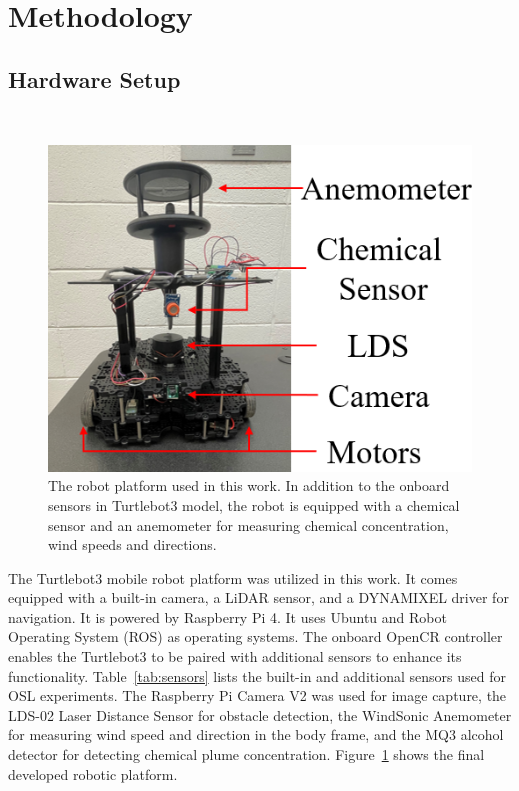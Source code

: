 \section{Methodology}
\subsection{Hardware Setup}\label{Subec:OSLHardware}

\begin{figure}[h] %

\ \\
\vspace*{-.18in}

\begin{center}
\includegraphics[width=0.6\columnwidth]{Main/Figure/olfaction_Turtlebot.png}\hspace*{0.04in}
\end{center}
\vspace{-.1in}

\caption
{The robot platform used in this work. In addition to the onboard sensors in Turtlebot3 model, the robot is equipped with a chemical sensor and an anemometer for measuring chemical concentration, wind speeds and directions.}
\label{fig:olfaction_robot}
\end{figure}

The Turtlebot3 mobile robot platform was utilized in this work. It comes equipped with a built-in camera, a LiDAR sensor, and a DYNAMIXEL driver for navigation. It is powered by Raspberry Pi 4. It uses Ubuntu and Robot Operating System (ROS) as operating systems. The onboard OpenCR controller enables the Turtlebot3 to be paired with additional sensors to enhance its functionality. Table~\ref{tab:sensors} lists the built-in and additional sensors used for OSL experiments. The Raspberry Pi Camera V2 was used for image capture, the LDS-02 Laser Distance Sensor for obstacle detection, the WindSonic Anemometer for measuring wind speed and direction in the body frame, and the MQ3 alcohol detector for detecting chemical plume concentration. Figure~\ref{fig:olfaction_robot} shows the final developed robotic platform.

